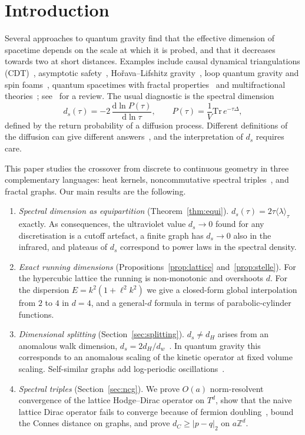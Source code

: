 \documentclass[11pt]{article}
\theoremstyle{remark}\newtheorem*{remark}{Remark}
\newcommand{\dd}{\mathrm{d}}
\newcommand{\Tr}{\mathrm{Tr}}
\newcommand{\ZZ}{\mathbb{Z}}
\begin{document}
\tableofcontents

\section{Introduction}
\label{sec:intro}

Several approaches to quantum gravity find that the effective dimension of spacetime depends on the scale at
which it is probed, and that it decreases towards two at short distances. Examples include causal dynamical
triangulations (CDT)~\cite{AJL}, asymptotic safety~\cite{LauscherReuter}, Ho\v{r}ava--Lifshitz
gravity~\cite{Horava}, loop quantum gravity and spin foams~\cite{Modesto}, quantum spacetimes with fractal
properties~\cite{Benedetti} and multifractional theories~\cite{Calcagni}; see~\cite{Carlip} for a review. The
usual diagnostic is the spectral dimension
\begin{equation}
d_s(\tau)=-2\,\frac{\dd\ln P(\tau)}{\dd\ln\tau},\qquad P(\tau)=\frac1V\Tr\,e^{-\tau\Delta},
\label{eq:ds}
\end{equation}
defined by the return probability of a diffusion process. Different definitions of the diffusion can give
different answers~\cite{CES}, and the interpretation of $d_s$ requires care.

This paper studies the crossover from discrete to continuous geometry in three complementary languages:
heat kernels, noncommutative spectral triples~\cite{ConnesBook,Connes96}, and fractal graphs. Our main
results are the following.
\begin{enumerate}
\item \emph{Spectral dimension as equipartition} (Theorem~\ref{thm:equi}). $d_s(\tau)=2\tau\langle\lambda\rangle_\tau$
exactly. As consequences, the ultraviolet value $d_s\to0$ found for any discretisation is a cutoff artefact, a
finite graph has $d_s\to0$ also in the infrared, and plateaus of $d_s$ correspond to power laws in the spectral
density.
\item \emph{Exact running dimensions} (Propositions~\ref{prop:lattice} and~\ref{prop:stelle}). For the
hypercubic lattice the running is non-monotonic and overshoots $d$. For the dispersion $E=k^2(1+\ell^2k^2)$ we
give a closed-form global interpolation from $2$ to $4$ in $d=4$, and a general-$d$ formula in terms of
parabolic-cylinder functions.
\item \emph{Dimensional splitting} (Section~\ref{sec:splitting}). $d_s\neq d_H$ arises from an anomalous walk
dimension, $d_s=2d_H/d_w$~\cite{AlexanderOrbach,RammalToulouse}. In quantum gravity this corresponds to an
anomalous scaling of the kinetic operator at fixed volume scaling. Self-similar graphs add log-periodic
oscillations~\cite{ADT}.
\item \emph{Spectral triples} (Section~\ref{sec:ncg}). We prove $O(a)$ norm-resolvent convergence of the lattice
Hodge--Dirac operator on $T^d$, show that the naive lattice Dirac operator fails to converge because of fermion
doubling~\cite{NielsenNinomiya}, bound the Connes distance on graphs, and prove $d_C\ge|p-q|_2$ on
$a\ZZ^d$.
\end{enumerate}
\end{document}
